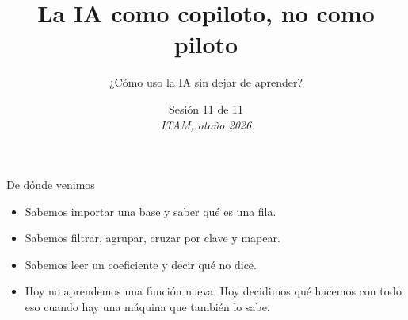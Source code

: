 %
%



\title[Lab de R · Sesión 11]{La IA como copiloto, no como piloto}
\subtitle{¿Cómo uso la IA sin dejar de aprender?}
\date{%
  Sesión 11 de 11\\[0.3em]
  \textit{ITAM, otoño 2026}%
}



{
\begin{frame}
  \titlepage
\end{frame}}


\begin{frame}{De dónde venimos}
  \vspace{0.3em}
  \begin{itemize}\setlength{\itemsep}{0.85em}
    \item<1-> Sabemos importar una base y saber qué es una fila.
    \item<2-> Sabemos filtrar, agrupar, cruzar por clave y mapear.
    \item<3-> Sabemos leer un coeficiente y decir qué no dice.
    \item<4-> Hoy no aprendemos una función nueva. Hoy decidimos qué hacemos
          con todo eso cuando hay una máquina que también lo sabe.
  \end{itemize}
\end{frame}

